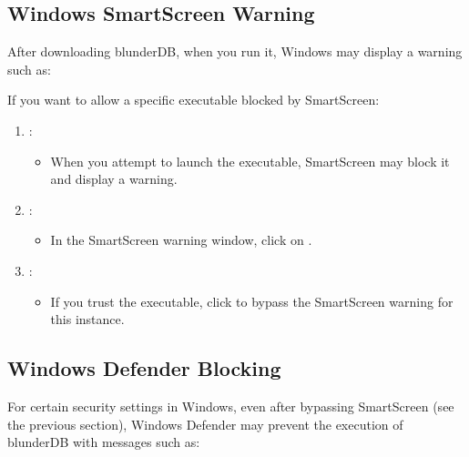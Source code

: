 \documentclass[letterpaper,10pt,english]{sphinxmanual}
\begin{document}
\subsection{Windows SmartScreen Warning}
\label{\detokenize{annexe_windows_securite:avertissement-windows-smartscreen}}
\sphinxAtStartPar
After downloading blunderDB, when you run it, Windows may display a warning such as:

\begin{figure}[htbp]
\centering

\noindent{}
\end{figure}

\sphinxAtStartPar
If you want to allow a specific executable blocked by SmartScreen:
\begin{enumerate}
%
\item {} 
\sphinxAtStartPar
{}:
\begin{itemize}
\item {} 
\sphinxAtStartPar
When you attempt to launch the executable, SmartScreen may block it and display a warning.

\end{itemize}

\item {} 
\sphinxAtStartPar
{}:
\begin{itemize}
\item {} 
\sphinxAtStartPar
In the SmartScreen warning window, click on .

\end{itemize}

\item {} 
\sphinxAtStartPar
{}:
\begin{itemize}
\item {} 
\sphinxAtStartPar
If you trust the executable, click  to bypass the SmartScreen warning for this instance.

\end{itemize}

\end{enumerate}


\subsection{Windows Defender Blocking}
\label{\detokenize{annexe_windows_securite:blocage-windows-defender}}
\sphinxAtStartPar
For certain security settings in Windows, even after bypassing SmartScreen (see the previous section), Windows Defender may prevent the execution of blunderDB with messages such as:
\end{document}
